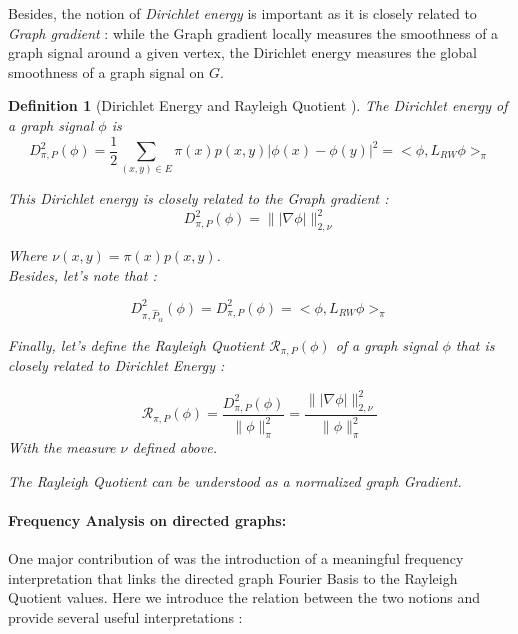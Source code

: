 \documentclass{article}
\newtheorem{definition}{Definition}[section]
\begin{document}
Besides, the notion of \textit{Dirichlet energy} is important as it is closely related to \textit{Graph gradient} : while the Graph gradient locally measures the smoothness of a graph signal around a given vertex, the Dirichlet energy measures the global smoothness of a graph signal on $G$.

\begin{definition}[Dirichlet Energy and Rayleigh Quotient \cite{sevi2019, montenegro_tetali_2005}]

The Dirichlet energy of a graph signal $\phi$ is
\begin{equation}
    D^2_{\pi, P} (\phi) = \frac{1}{2} \underset{(x,y)\in E}{\sum} \pi(x) p(x,y) |\phi(x)-\phi(y)|^2 = <\phi, L_{RW} \phi>_{\pi} 
\end{equation}

This Dirichlet energy is closely related to the \textit{Graph gradient} :
\begin{equation}
    D^2_{\pi, P} (\phi) = \| |\nabla \phi| \|^2_{2, \nu}
\end{equation}

Where $\nu(x,y) = \pi(x) p(x,y)$. \\

Besides, let's note that :

\begin{equation}
    D^2_{\pi, \hat{P}_\alpha}(\phi) = D^2_{\pi, P}(\phi) = <\phi, L_{RW} \phi>_{\pi}
\end{equation}

Finally, let's define the Rayleigh Quotient $\mathcal{R}_{\pi, P}(\phi)$ of a graph signal $\phi$ that is closely related to \textit{Dirichlet Energy} :

\begin{equation}
    \mathcal{R}_{\pi, P}(\phi) = \frac{D_{\pi, P}^2(\phi)}{\| \phi \|_{\pi}^2} = \frac{\| |\nabla \phi| \|^2_{2, \nu}}{\| \phi \|_{\pi}^2}
\end{equation}
With the measure $\nu$ defined above.

The Rayleigh Quotient can be understood as a normalized graph Gradient.

\end{definition}

\paragraph{Frequency Analysis on directed graphs:}
One major contribution of \cite{sevi2019} was the introduction of a meaningful frequency interpretation that links the directed graph Fourier Basis to the Rayleigh Quotient values. Here we introduce the relation between the two notions and provide several useful interpretations :
\end{document}
